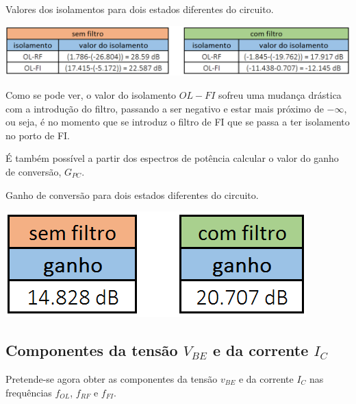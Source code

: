 \documentclass[11pt]{article}
\numberwithin{equation}{section}
\begin{document}
\pagebreak

\begin{table}[h]
	\centering
	\caption{Valores dos isolamentos para dois estados diferentes do circuito.}
	\vspace{-1.5mm}
	\includegraphics[keepaspectratio=true, scale=0.40]{teoricas/isolamentosSemComFiltro}
\end{table}

Como se pode ver, o valor do isolamento $OL - FI$ sofreu uma mudança drástica com a introdução do filtro, passando a ser negativo e estar mais próximo de  $- \infty$, ou seja, é no momento que se introduz o filtro de FI que se passa a ter isolamento no porto de FI.

É também possível a partir dos espectros de potência calcular o valor do ganho de conversão, $G_{PC}$.

\begin{table}[h]
	\centering
	\caption{Ganho de conversão para dois estados diferentes do circuito.}
	\vspace{-1.5mm}
	\includegraphics[keepaspectratio=true, scale=0.40]{teoricas/ganhoSemComFiltro}
\end{table}


\subsection{Componentes da tensão $V_{BE}$ e da corrente $I_{C}$} 

Pretende-se agora obter as componentes da tensão $v_{BE}$ e da corrente $I_{C}$ nas frequências $f_{OL}$, $f_{RF}$ e $f_{FI}$.
\end{document}
